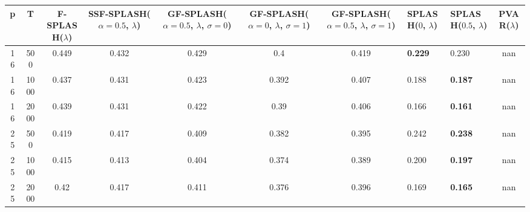 \begin{tabular}{cccccccllc}
\hline
  p  &  T   &  F-SPLASH($\lambda$)  &  SSF-SPLASH($\alpha=0.5$, $\lambda$)  &  GF-SPLASH($\alpha=0.5$, $\lambda$, $\sigma=0$)  &  GF-SPLASH($\alpha=0$, $\lambda$, $\sigma=1$)  &  GF-SPLASH($\alpha=0.5$, $\lambda$, $\sigma=1$)  & SPLASH($0$, $\lambda$)   & SPLASH($0.5$, $\lambda$)   &  PVAR($\lambda$)  \\
\hline
 16  & 500  &         0.449         &                 0.432                 &                      0.429                       &                      0.4                       &                      0.419                       & \textbf{0.229}           & 0.230                      &        nan        \\
 16  & 1000 &         0.437         &                 0.431                 &                      0.423                       &                     0.392                      &                      0.407                       & 0.188                    & \textbf{0.187}             &        nan        \\
 16  & 2000 &         0.439         &                 0.431                 &                      0.422                       &                      0.39                      &                      0.406                       & 0.166                    & \textbf{0.161}             &        nan        \\
 25  & 500  &         0.419         &                 0.417                 &                      0.409                       &                     0.382                      &                      0.395                       & 0.242                    & \textbf{0.238}             &        nan        \\
 25  & 1000 &         0.415         &                 0.413                 &                      0.404                       &                     0.374                      &                      0.389                       & 0.200                    & \textbf{0.197}             &        nan        \\
 25  & 2000 &         0.42          &                 0.417                 &                      0.411                       &                     0.376                      &                      0.396                       & 0.169                    & \textbf{0.165}             &        nan        \\
\hline
\end{tabular}